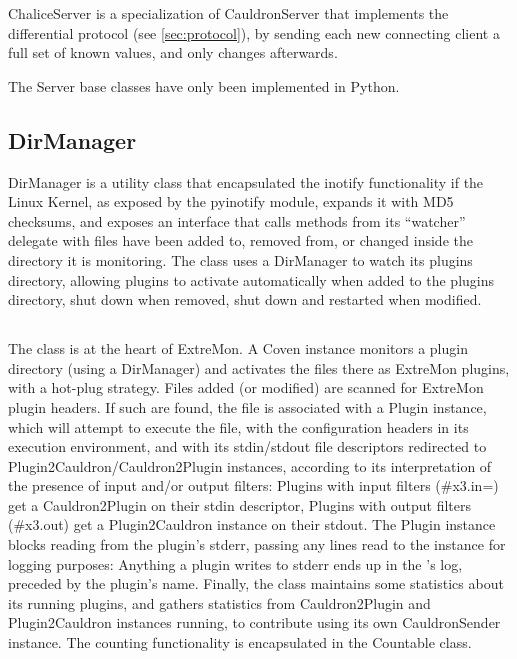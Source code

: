 ChaliceServer is a specialization of CauldronServer that implements
the differential protocol (see \ref{sec:protocol}), by sending
each new connecting client a full set of known values, and only changes
afterwards.

The Server base classes have only been implemented in Python.

\subsection{DirManager}

DirManager is a utility class that encapsulated the inotify functionality
if the Linux Kernel, as exposed by the pyinotify module, expands it
with MD5 checksums, and exposes an interface that calls methods from
its ``watcher'' delegate with files have been added to, removed from,
or changed inside the directory it is monitoring. The \coven{} class
uses a DirManager to watch its plugins directory, allowing plugins to
activate automatically when added to the plugins directory, shut down
when removed, shut down and restarted when modified.

\subsection{\coven{}}

The \coven{} class is at the heart of ExtreMon. A Coven instance monitors
a plugin directory (using a DirManager) and activates the files there
as ExtreMon plugins, with a hot-plug strategy. Files added (or modified)
are scanned for ExtreMon plugin headers. If such are found, the file is
associated with a Plugin instance, which will attempt to execute the
file, with the configuration headers in its execution environment,
and with its stdin\slash{}stdout file descriptors redirected to
Plugin2Cauldron\slash{}Cauldron2Plugin instances, according to its
interpretation of the presence of input and\slash{}or output filters:
Plugins with input filters (\#x3.in=) get a Cauldron2Plugin on their stdin
descriptor, Plugins with output filters (\#x3.out) get a Plugin2Cauldron
instance on their stdout. The Plugin instance blocks reading from the
plugin's stderr, passing any lines read to the \coven{} instance for
logging purposes: Anything a plugin writes to stderr ends up in the
\coven{}'s log, preceded by the plugin's name. Finally, the \coven{}
class maintains some statistics about its running plugins, and gathers
statistics from Cauldron2Plugin and Plugin2Cauldron instances running,
to contribute using its own CauldronSender instance. The counting
functionality is encapsulated in the Countable class.

